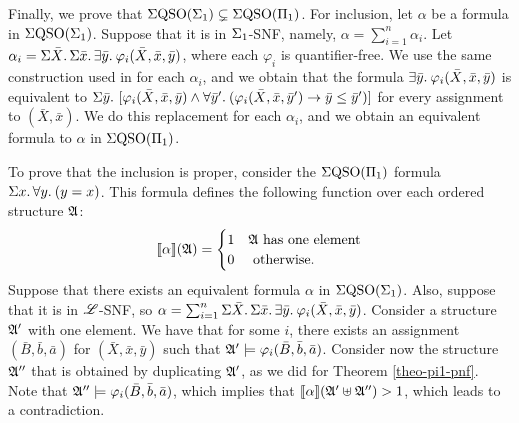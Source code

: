 Finally, we prove that $\Sigma{\rm QSO}(\Sigma_{1})\subsetneq\Sigma{\rm QSO}(\Pi_{1})$. 
For inclusion, let $\alpha$ be a formula in $\Sigma{\rm QSO}(\Sigma_{1})$. 
Suppose that it is in $\Sigma_{1}$-SNF, namely, $\alpha = \sum_{i = 1}^{n}\alpha_i$. 
Let $\alpha_i = \Sigma{\bar{X}}.\,\Sigma{\bar{x}}.\,\exists{\bar{y}}.\:\varphi_i(\bar{X},\bar{x},\bar{y})$, where each $\varphi_i$ is quantifier-free. 
We use the same construction used in \cite{SalujaST95} for each $\alpha_i$, and we obtain that the formula $\exists{\bar{y}}.\:\varphi_i(\bar{X},\bar{x},\bar{y})$ is equivalent to $\Sigma{\bar{y}}.\,\,[\varphi_i(\bar{X},\bar{x},\bar{y}) \wedge \forall{\bar{y}'}.\:(\varphi_i(\bar{X},\bar{x},\bar{y}')\to\bar{y}\leq\bar{y}')]$ for every assignment to $(\bar{X},\bar{x})$. 
We do this replacement for each $\alpha_i$, and we obtain an equivalent formula to $\alpha$ in $\Sigma{\rm QSO}(\Pi_{1})$.

To prove that the inclusion is proper, consider the $\Sigma{\rm QSO}(\Pi_{1})$ formula $\Sigma{x}.\, \forall{y}.\:(y = x)$. 
This formula defines the following function over each ordered structure $\mathfrak{A}$:
$$
{\llbracket{}{\alpha}\rrbracket}(\mathfrak{A}) = 
\begin{cases}
1 &\mathfrak{A} \text{ has one element}\\
0 &\text{ otherwise}.
\end{cases}
$$
Suppose that there exists an equivalent formula $\alpha$ in $\Sigma{\rm QSO}(\Sigma_{1})$. 
Also, suppose that it is in $\mathscr{L}$-SNF, so $\alpha = \sum_{i = 1}^n\Sigma{\bar{X}}.\,\Sigma{\bar{x}}.\,\exists{\bar{y}}.\:\varphi_i(\bar{X},\bar{x},\bar{y})$. 
Consider a structure $\mathfrak{A}'$ with one element. 
We have that for some $i$, there exists an assignment $(\bar{B},\bar{b},\bar{a})$ for $(\bar{X},\bar{x},\bar{y})$ such that $\mathfrak{A}' \models\varphi_i(\bar{B},\bar{b},\bar{a})$. 
Consider now the structure $\mathfrak{A}''$ that is obtained by duplicating $\mathfrak{A}'$, as we did for Theorem \ref{theo-pi1-pnf}. 
Note that $\mathfrak{A}''\models\varphi_i(\bar{B},\bar{b},\bar{a})$, which implies that ${\llbracket{}{\alpha}\rrbracket}(\mathfrak{A}' \uplus \mathfrak{A}'') > 1$, which leads to a contradiction.